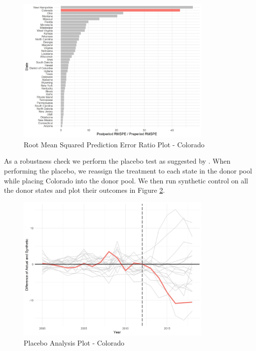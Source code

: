 \documentclass{article}
\begin{document}
\begin{figure}[H]
	\begin{center}
		\includegraphics[width=0.85\textwidth]{mspe_plot_colorado}
	\end{center}
	\caption{Root Mean Squared Prediction Error Ratio Plot - Colorado}
	\label{fig:mspe_plot_colorado}
\end{figure}

As a robustness check we perform the placebo test as suggested by \citet{AbadieAlberto2010SCMf}. When performing the placebo, we reassign the treatment to each state in the donor pool while placing Colorado into the donor pool. We then run synthetic control on all the donor states and plot their outcomes in Figure \ref{fig:placebos_plot_colorado}.

\begin{figure}[H]
	\begin{center}
		\includegraphics[width=0.85\textwidth]{placebos_plot_colorado}
	\end{center}
	\caption{Placebo Analysis Plot - Colorado}
	\label{fig:placebos_plot_colorado}
\end{figure}
\end{document}
